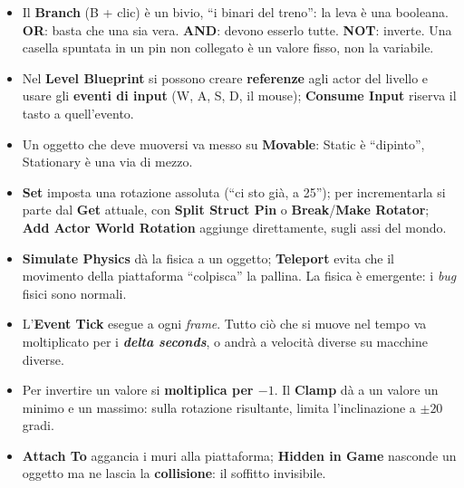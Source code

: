 \begin{itemize}
  \item Il \textbf{Branch} (B + clic) è un bivio, ``i binari del treno'': la leva è una
        booleana. \textbf{OR}: basta che una sia vera. \textbf{AND}: devono esserlo
        tutte. \textbf{NOT}: inverte. Una casella spuntata in un pin non collegato è un
        valore fisso, non la variabile.
  \item Nel \textbf{Level Blueprint} si possono creare \textbf{referenze} agli actor del
        livello e usare gli \textbf{eventi di input} (W, A, S, D, il mouse);
        \textbf{Consume Input} riserva il tasto a quell'evento.
  \item Un oggetto che deve muoversi va messo su \textbf{Movable}: Static è
        ``dipinto'', Stationary è una via di mezzo.
  \item \textbf{Set} imposta una rotazione assoluta (``ci sto già, a 25''); per
        incrementarla si parte dal \textbf{Get} attuale, con \textbf{Split Struct Pin}
        o \textbf{Break}/\textbf{Make Rotator}; \textbf{Add Actor World Rotation}
        aggiunge direttamente, sugli assi del mondo.
  \item \textbf{Simulate Physics} dà la fisica a un oggetto; \textbf{Teleport} evita
        che il movimento della piattaforma ``colpisca'' la pallina. La fisica è
        emergente: i \emph{bug} fisici sono normali.
  \item L'\textbf{Event Tick} esegue a ogni \emph{frame}. Tutto ciò che si muove nel
        tempo va moltiplicato per i \textbf{\emph{delta seconds}}, o andrà a velocità
        diverse su macchine diverse.
  \item Per invertire un valore si \textbf{moltiplica per $-1$}. Il \textbf{Clamp} dà a
        un valore un minimo e un massimo: sulla rotazione risultante, limita
        l'inclinazione a $\pm 20$ gradi.
  \item \textbf{Attach To} aggancia i muri alla piattaforma; \textbf{Hidden in Game}
        nasconde un oggetto ma ne lascia la \textbf{collisione}: il soffitto
        invisibile.
\end{itemize}
